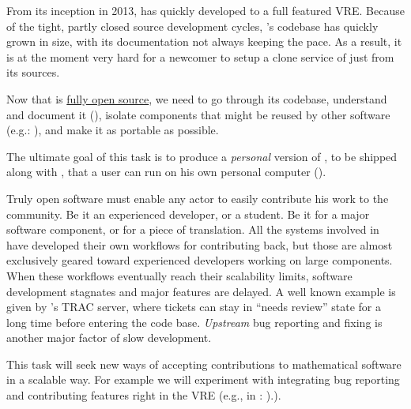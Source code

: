 \begin{workpackage}[id=component-architecture,wphases=0-48!.5,
  title=Component Architecture,lead=UV,
  PSRM=24,UVRM=8,SARM=16, USHRM=4, USORM=6]
\begin{tasklist}
  \begin{task}[title=Document and modularize \SMC's codebase,id=extract-smc,lead=PS,PM=10]
    From its inception in 2013, \SMC has quickly developed to a full
    featured VRE.  Because of the tight, partly closed source
    development cycles, \SMC's codebase has quickly grown in size,
    with its documentation not always keeping the pace. As a result,
    it is at the moment very hard for a newcomer to setup a clone
    service of \SMC just from its sources.

    Now that \SMC is
    \href{https://twitter.com/sagemath/status/544939872294014977}{fully
      open source}, we need to go through its codebase, understand and
    document it
    (), isolate
    components that might be reused by other software (e.g.:
    \Jupyter), and make it as portable as possible.

    The ultimate goal of this task is to produce a \emph{personal}
    version of \SMC, to be shipped along with \Sage, that a user can
    run on his own personal computer
    ().
  \end{task}

  \begin{task}[title=Improving the development workflow in mathematical software,lead=UV,PM=4]
    Truly open software must enable any actor to easily contribute his
    work to the community. Be it an experienced developer, or a
    student. Be it for a major software component, or for a piece of
    translation. All the systems involved in \TheProject have
    developed their own workflows for contributing back, but those are
    almost exclusively geared toward experienced developers working on
    large components. When these workflows eventually reach their
    scalability limits, software development stagnates and major
    features are delayed. A well known example is given by \Sage's TRAC
    server, where tickets can stay in ``needs review'' state for a
    long time before entering the code base.  \emph{Upstream} bug
    reporting and fixing is another major factor of slow development.

    This task will seek new ways of accepting contributions to
    mathematical software in a scalable way. For example we will
    experiment with integrating bug reporting and contributing
    features right in the VRE (e.g., in \SMC:
    ).).



\end{task}
\end{tasklist}
\end{workpackage}
